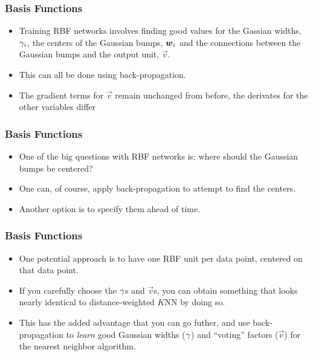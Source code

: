 \documentclass[trans]{beamer}
\begin{document}

\begin{frame}
  \frametitle{Basis Functions}
\begin{itemize}
\item
Training RBF networks involves finding good values for the Gassian
widths, $\gamma_i$, the centers of the Gaussian bumps, ${\boldsymbol{w}}_i$ and the
connections between the Gaussian bumps and the output unit, $\vec v$.
\item This can all be done using back-propagation. 
\item The gradient terms for
$\vec v$ remain unchanged from before, the derivates for the other
variables differ 
\end{itemize}
\end{frame}

\begin{frame}
  \frametitle{Basis Functions}
\begin{itemize}
\item
One of the big questions with RBF networks is: where should the
Gaussian bumps be centered? 
\item  One can, of course, apply
back-propagation to attempt to find the centers. 
\item Another option is to
specify them ahead of time.
\end{itemize}
\end{frame}

\begin{frame}
  \frametitle{Basis Functions}
\begin{itemize}
\item One potential approach is
to have one RBF unit per data point, centered on that data point. 
\item If
you carefully choose the $\gamma$s and $\vec v$s, you can obtain
something that looks nearly identical to distance-weighted $K$NN by
doing so. 
\item This has the added advantage that you can go futher, and
use back-propagation to \emph{learn} good Gaussian widths ($\gamma$) and
``voting'' factors ($\vec v$) for the nearest neighbor algorithm.
\end{itemize}
\end{frame}
\end{document}
